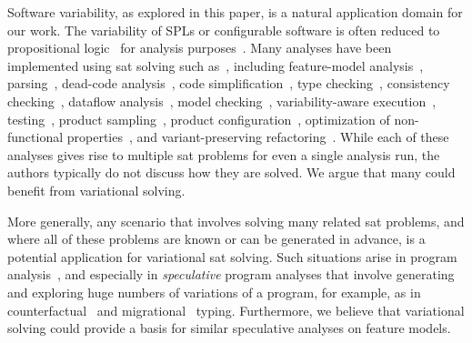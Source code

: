 %
Software variability, as explored in this paper, is a natural application domain
for our work. The variability of SPLs or configurable software is often reduced
to propositional logic~\citep{B05,CW07,MWCC08} for analysis
purposes~\citep{BSRC10,TAK+:CSUR14,GBT+19}. Many analyses have been implemented
using \ac{sat} solving such as~\cite{TAK+:CSUR14}, including feature-model
analysis~\citep{BSRC10,GBT+19}, parsing~\citep{KGR+:OOPSLA11}, dead-code
analysis~\citep{TLSS:EuroSys11}, code simplification~\citep{RGA+:ICSE15}, type
checking~\citep{TBKC07}, consistency checking~\citep{CP06}, dataflow
analysis~\citep{LKA+:ESECFSE13}, model checking~\citep{CCS+13},
variability-aware execution~\citep{NKN:ICSE14}, testing~\citep{MMCA:IST14},
product sampling~\citep{MKR+:ICSE16,VAT+:SPLC18}, product
configuration~\citep{SIMA:ASE13}, optimization of non-functional
properties~\citep{SRK+:SQJ12}, and variant-preserving
refactoring~\citep{FMS+:SANER17}. While each of these analyses gives rise to
multiple \ac{sat} problems for even a single analysis run, the authors typically
do not discuss how they are solved. We argue that many could benefit from
variational solving.

More generally, any scenario that involves solving many related \ac{sat}
problems, and where all of these problems are known or can be generated in
advance, is a potential application for variational \ac{sat} solving.
%
Such situations arise in program analysis~\citep{VGD:FSE12}, and especially in
\emph{speculative} program analyses that involve generating and exploring huge
numbers of variations of a program, for example, as in
counterfactual~\citep{CE14popl} and migrational~\citep{CCW18icfp,CCEW18popl}
typing. Furthermore, we believe that variational solving could provide a basis
for similar speculative analyses on feature models.


